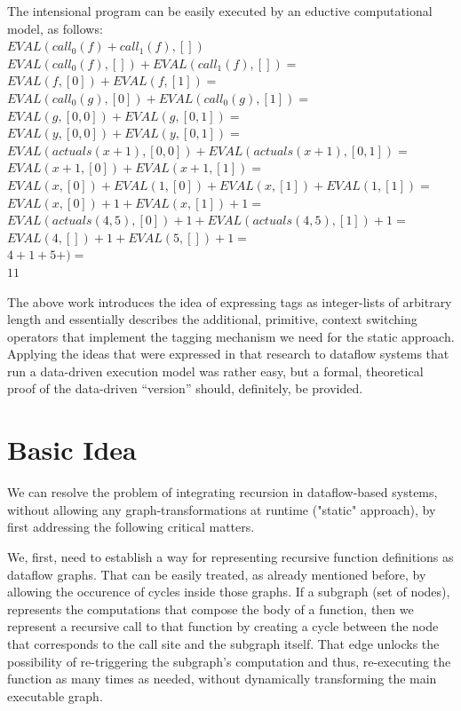 \documentclass[ack,preface]{dithesis}
\begin{document}
\begin{flushleft}
The intensional program can be easily executed by an eductive computational model, as follows:\\
 \setlength{\parindent}{15ex} $EVAL(call_0(f)+call_1(f), [])$ \\
$EVAL(call_0(f), []) + EVAL(call_1(f), []) =$ \\ 
$EVAL(f, [0]) + EVAL(f, [1]) =$ \\ 
$EVAL(call_0(g), [0]) + EVAL(call_0(g), [1]) =$ \\ 
$EVAL(g, [0,0]) + EVAL(g, [0,1]) =$ \\ 
$EVAL(y, [0,0]) + EVAL(y, [0,1]) =$ \\ 
$EVAL(actuals(x+1), [0,0]) + EVAL(actuals(x+1), [0,1]) =$ \\ 
$EVAL(x+1, [0]) + EVAL(x+1, [1]) =$ \\ 
$EVAL(x, [0]) + EVAL(1, [0]) + EVAL(x, [1]) + EVAL(1, [1]) =$ \\ 
$EVAL(x, [0]) + 1 + EVAL(x, [1]) + 1 =$ \\
$EVAL(actuals(4,5), [0]) + 1 + EVAL(actuals(4,5), [1]) + 1 =$ \\
$EVAL(4, []) + 1 + EVAL(5, []) + 1 =$ \\
$4+1+5+ ) =$ \\
$11$ \\
\end{flushleft}


The above work introduces the idea of expressing tags as integer-lists of arbitrary length and essentially describes the additional, primitive, context switching operators that implement the tagging mechanism we need for the static approach. Applying the ideas that were expressed in that research to dataflow systems that run a data-driven execution model was rather easy, but a formal, theoretical proof of the data-driven “version” should, definitely, be provided.

    \section{Basic Idea}
We can resolve the problem of integrating recursion in dataflow-based systems, without allowing any graph-transformations at runtime ("static" approach), by first addressing the following critical matters.

We, first, need to establish a way for representing recursive function definitions as dataflow graphs.  That can be easily treated, as already mentioned before, by allowing the occurence of cycles inside those graphs. If a subgraph (set of nodes), represents the computations that compose the body of a function, then we represent a recursive call to that function by creating a cycle between the node that corresponds to the call site and the subgraph itself. That edge unlocks the possibility of  re-triggering the subgraph's computation and thus, re-executing the function as many times as needed, without dynamically transforming the main executable graph.
\end{document}
